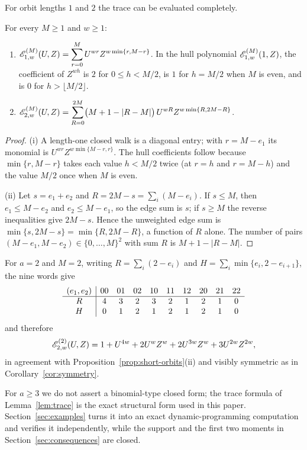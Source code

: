 For orbit lengths $1$ and $2$ the trace can be evaluated completely.

\begin{proposition}\label{prop:short-orbits}
For every $M\geq1$ and $w\geq1$:
\begin{enumerate}
\item[\textup{(i)}]
$\displaystyle
\mathscr E_{1,w}^{(M)}(U,Z)
 =\sum_{r=0}^{M}U^{wr}Z^{w\min\{r,M-r\}}$.
In the hull polynomial $\mathscr E_{1,w}^{(M)}(1,Z)$, the coefficient of $Z^{wh}$
is $2$ for $0\leq h<M/2$, is $1$ for $h=M/2$ when $M$ is even, and is $0$ for
$h>\lfloor M/2\rfloor$.
\item[\textup{(ii)}]
$\displaystyle
\mathscr E_{2,w}^{(M)}(U,Z)
 =\sum_{R=0}^{2M}\bigl(M+1-|R-M|\bigr)\,
    U^{wR}Z^{w\min\{R,2M-R\}}$.
\end{enumerate}
\end{proposition}

\begin{proof}
(i) A length-one closed walk is a diagonal entry; with $r=M-e_1$ its monomial is
$U^{wr}Z^{w\min\{M-r,r\}}$.  The hull coefficients follow because
$\min\{r,M-r\}$ takes each value $h<M/2$ twice (at $r=h$ and $r=M-h$) and the
value $M/2$ once when $M$ is even.

(ii) Let $s=e_1+e_2$ and $R=2M-s=\sum_i(M-e_i)$.  If $s\leq M$, then
$e_1\leq M-e_2$ and $e_2\leq M-e_1$, so the edge sum is $s$; if $s\geq M$ the
reverse inequalities give $2M-s$.  Hence the unweighted edge sum is
$\min\{s,2M-s\}=\min\{R,2M-R\}$, a function of $R$ alone.  The number of pairs
$(M-e_1,M-e_2)\in\{0,\ldots,M\}^2$ with sum $R$ is $M+1-|R-M|$.
\end{proof}

\begin{example}\label{ex:a2M2}
For $a=2$ and $M=2$, writing $R=\sum_i(2-e_i)$ and
$H=\sum_i\min\{e_i,2-e_{i+1}\}$, the nine words give
\[
\setlength{\tabcolsep}{4pt}
\begin{array}{c|ccccccccc}
(e_1,e_2)&00&01&02&10&11&12&20&21&22\\ \hline
R&4&3&2&3&2&1&2&1&0\\
H&0&1&2&1&2&1&2&1&0
\end{array}
\]
and therefore
\[
\mathscr E_{2,w}^{(2)}(U,Z)
 =1+U^{4w}+2U^wZ^w+2U^{3w}Z^w+3U^{2w}Z^{2w},
\]
in agreement with Proposition~\ref{prop:short-orbits}(ii) and visibly symmetric
as in Corollary~\ref{cor:symmetry}.
\end{example}

For $a\geq3$ we do not assert a binomial-type closed form; the trace formula
of Lemma~\ref{lem:trace} is the exact structural form used in this paper.
Section~\ref{sec:examples} turns it into an exact dynamic-programming
computation and verifies it independently, while the support and the first
two moments in Section~\ref{sec:consequences} are closed.


